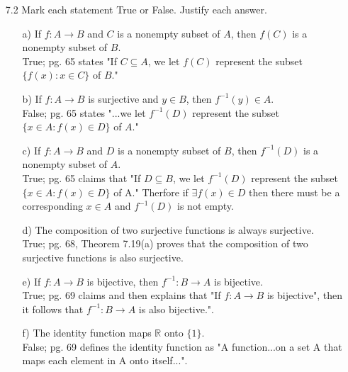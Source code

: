 \documentclass[12pt]{article}
\begin{document}
\begin{enumerate}
\item[7.2] Mark each statement True or False. Justify each answer.
\begin{enumerate}
\item[a)] If $f: A \rightarrow B$ and $C$ is a nonempty subset of $A$, then $f(C)$ is a nonempty subset of $B$. \\
True; pg. 65 states "If $C \subseteq A$, we let $f(C)$ represent the subset
$\{f(x): x \in C\}$ of $B$."
\item[b)] If $f: A \rightarrow B$ is surjective and $y \in B$, then $f^{-1}(y) \in A$. \\
False; pg. 65 states "...we let $f^{-1}(D)$ represent the subset $\{x \in A: f(x) \in D\}$
of $A$." 
\item[c)] If $f: A \rightarrow B$ and $D$ is a nonempty subset of $B$, then $f^{-1}(D)$ is a nonempty subset of $A$. \\
True; pg. 65 claims that "If $D \subseteq B$, we let $f^{-1}(D)$ represent the subset 
$\{x \in A: f(x) \in D\}$ of A." Therfore if $\exists f(x) \in D$ then there must be a corresponding $x \in A$
and $f^{-1}(D)$ is not empty.
\item[d)] The composition of two surjective functions is always surjective. \\
True; pg. 68, Theorem 7.19(a) proves that the composition of two surjective functions is also
surjective.
\item[e)] If $f: A \rightarrow B$ is bijective, then $f^{-1}: B \rightarrow A$ is bijective. \\
True; pg. 69 claims and then explains that "If $f: A \rightarrow B$ is bijective", then 
it follows that $f^{-1}: B \rightarrow A$ is also bijective.".
\item[f)] The identity function maps $\mathbb{R}$ onto $\{ 1 \}$. \\
False; pg. 69 defines the identity function as "A function...on a set A that maps each element
in A onto itself...".
\end{enumerate}


\end{enumerate}
\end{document}

